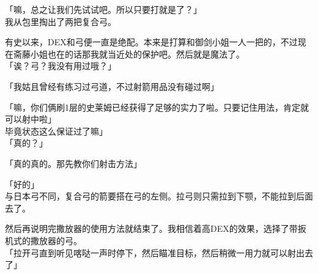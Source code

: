 「嘛，总之让我们先试试吧。所以只要打就是了？」\\

我从包里掏出了两把复合弓。

有史以来，DEX和弓便一直是绝配。本来是打算和御剑小姐一人一把的，不过现在斋藤小姐也在的话那我就当近处的保护吧。然后就是魔法了。\\

「诶？弓？我没有用过哦？」

「我姑且曾经有练习过弓道，不过射箭用品没有碰过啊」

「嘛，你们俩刷1层的史莱姆已经获得了足够的实力了啦。只要记住用法，肯定就可以射中啦」\\

毕竟状态这么保证过了嘛」\\

「真的？」

「真的真的。那先教你们射击方法」

「好的」\\

与日本弓不同，复合弓的箭要搭在弓的左侧。拉弓则只需拉到下颚，不能拉到后面去了。

然后再说明完撒放器的使用方法就结束了。我相信着高DEX的效果，选择了带扳机式的撒放器的弓。\\

「拉开弓直到听见喀哒一声时停下，然后瞄准目标，然后稍微一用力就可以射出去了」\\

